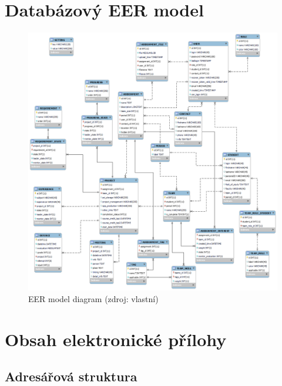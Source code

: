 \documentclass[czech,BP]{thesiskiv}
\begin{document}
{\begin{table}
\begin{xltabular}{\textwidth}{|r|X|}
	\end{xltabular}
\end{table}
\chapter{Databázový EER model}

\begin{figure}[H]
	\centering
	\includegraphics[width=1\textwidth]{img/database/database_model}
	\caption{EER model diagram (zdroj: vlastní)}
	\label{fig:uc_example}
\end{figure}
\chapter{Obsah elektronické přílohy}
\section{Adresářová struktura}

}
\end{document}
